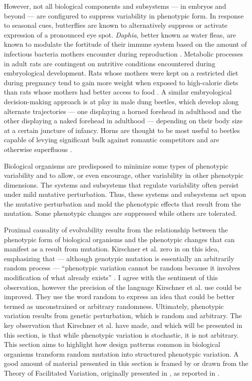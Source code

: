However, not all biological components and subsystems --- in embryos and beyond --- are configured to suppress variability in phenotypic form.
In response to seasonal cues, butterflies are known to alternatively suppress or activate expression of a pronounced eye spot. \textit{Daphia}, better known as water fleas, are known to modulate the fortitude of their immune system based on the amount of infectious bacteria mothers encounter during reproduction  \cite{Hamdoun2007EmbryoWorld.}.
Metabolic processes in adult rats are contingent on nutritive conditions encountered during embryological development.
Rats whose mothers were kept on a restricted diet during pregnancy tend to gain more weight when exposed to high-calorie diets than rats whose mothers had better access to food \cite[p 57]{Wilson2007EvolutionLives}.
A similar embryological decision-making approach is at play in male dung beetles, which develop along alternate trajectories --- one displaying a horned forehead in adulthood and the other displaying a naked forehead in adulthood --- depending on their body size at a certain juncture of infancy.
Horns are thought to be most useful to beetles capable of levying significant bulk against romantic competitors and are otherwise superfluous \cite[p 47]{Wilson2007EvolutionLives}.

Biological organisms are predisposed to minimize some types of phenotypic variability and to allow, or even encourage, other variability in other phenotypic dimensions.
The systems and subsystems that regulate variability often persist under mild mutative perturbation.
Thus, these systems and subsystems act upon the mutative perturbation and mold the phenotypic effects that result from the mutation.
Some phenotypic changes are suppressed while others are tolerated.

Proximal causality of evolvability results from the relationship between the phenotypic form of biological organisms and the phenotypic changes that can manifest as a result from mutation.
Kirschner et al. zero in on this idea, emphasizing that --- although genotypic mutation is essentially an arbitrarily random process --- ``phenotypic variation cannot be random because it involves modification of what already exists'' \cite[p 220]{Kirschner2005TheDilemma}.
I agree with the sentiment of this observation, however the precision of the language Kirschner et al. use could be improved.
They use the word random to express an idea that could be better termed as unconstrained or arbitrary randomness.
Ultimately, phenotypic variation results from genetic perturbation, which is random and arbitrary.
The key observation that Kirschner et al. have made, and which will be presented in this section, is that while phenotypic variation is stochastic, it is not arbitrary.
This section aims to highlight how design patterns common in biological organisms transform random mutation into structured phenotypic variation. A good amount of material presented in this section is framed by or drawn from the Theory of Facilitated Variation, originally presented in \cite{Kirschner2005TheDilemma}, as reported in \cite{Downing2015IntelligenceSystems}.


